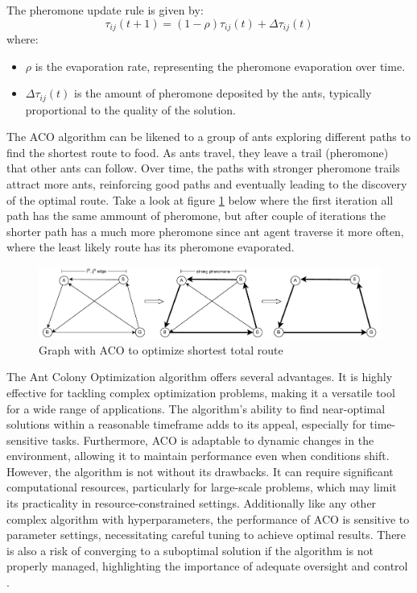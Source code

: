 \documentclass[12pt]{report}
\begin{document}
        The pheromone update rule is given by:
        \begin{equation}
        \tau_{ij}(t + 1) = (1 - \rho) \tau_{ij}(t) + \Delta \tau_{ij}(t)
        \end{equation}
        where:
        \begin{itemize}
          \item \( \rho \) is the evaporation rate, representing the pheromone evaporation over time.
          \item \( \Delta \tau_{ij}(t) \) is the amount of pheromone deposited by the ants, typically proportional to
          the quality of the solution.
        \end{itemize}
        
        The ACO algorithm can be likened to a group of ants exploring different paths to find the shortest route to
        food. As ants travel, they leave a trail (pheromone) that other ants can follow. Over time, the paths with
        stronger pheromone trails attract more ants, reinforcing good paths and eventually leading to the discovery of
        the optimal route. Take a look at figure \ref{fig:aco} below where the first iteration all path has the same
        ammount of pheromone, but after couple of iterations the shorter path has a much more pheromone since ant agent
        traverse it more often, where the least likely route has its pheromone evaporated.

        \begin{figure}[H]
            \centering
            \includegraphics[width=\textwidth]{General Image/OSM Drone-ACO.pdf}
            \caption{Graph with ACO to optimize shortest total route}
            \label{fig:aco}
        \end{figure}
        
        The Ant Colony Optimization algorithm offers several advantages. It is highly effective for tackling complex
        optimization problems, making it a versatile tool for a wide range of applications. The algorithm's ability to
        find near-optimal solutions within a reasonable timeframe adds to its appeal, especially for time-sensitive
        tasks. Furthermore, ACO is adaptable to dynamic changes in the environment, allowing it to maintain performance
        even when conditions shift. However, the algorithm is not without its drawbacks. It can require significant
        computational resources, particularly for large-scale problems, which may limit its practicality in
        resource-constrained settings. Additionally like any other complex algorithm with hyperparameters, the
        performance of ACO is sensitive to parameter settings, necessitating careful tuning to achieve optimal results.
        There is also a risk of converging to a suboptimal solution if the algorithm is not properly managed,
        highlighting the importance of adequate oversight and control \cite{dorigo_ant_2007}.
        
\end{document}
